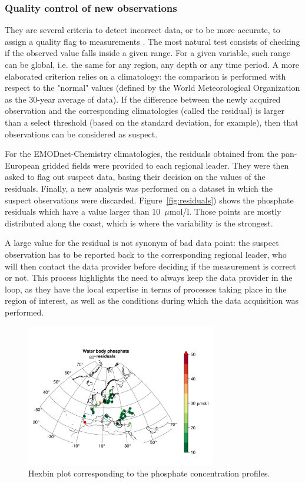 \documentclass[essd, manuscript]{copernicus}
\begin{document}
\subsubsection{Quality control of new observations}

They are several criteria to detect incorrect data, or to be more accurate, to assign a quality flag to measurements \citep{CUMMINGS2011,CABANES2021}. The most natural test consists of checking if the observed value falls inside a given range. For a given variable, such range can be global, i.e. the same for any region, any depth or any time period. A more elaborated criterion relies on a climatology: the comparison is performed with respect to the "normal" values (defined by the World Meteorological Organization as the 30-year average of data). If the difference between the newly acquired observation and the corresponding climatologies (called the residual) is larger than a select threshold (based on the standard deviation, for example), then that observations can be considered as suspect.

For the EMODnet-Chemistry climatologies, the residuals obtained from the pan-European gridded fields were provided to each regional leader. They were then asked to flag out suspect data, basing their decision on the values of the residuals. Finally, a new analysis was performed on a dataset in which the suspect observations were discarded. Figure~\ref{fig:residuals}) shows the phosphate residuals which have a value larger than 10~$\mu$mol/l. Those points are mostly distributed along the coast, which is where the variability is the strongest. 

A large value for the residual is not synonym of bad data point: the suspect observation has to be reported back to the corresponding regional leader, who will then contact the data provider before deciding if the measurement is correct or not. This process highlights the need to always keep the data provider in the loop, as they have the local expertise in terms of processes taking place in the region of interest, as well as the conditions during which the data acquisition was performed. 

\begin{figure}[t]
\includegraphics[width=8.3cm]{residuals_Water_body_phosphate.png}
\caption{Hexbin plot corresponding to the phosphate concentration profiles.\label{fig:histogram_value_Water_body_phosphate}}
\end{figure}
\end{document}
